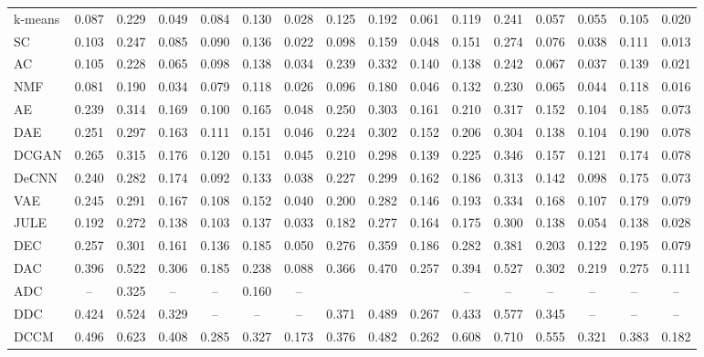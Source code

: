 \begin{table*}[t]
{\begin{tabular}{@{}lccccccccccccccc@{}}
k-means    & 0.087 & 0.229 & 0.049 & 0.084 & 0.130 & 0.028 & 0.125 & 0.192 & 0.061 & 0.119 & 0.241 & 0.057 & 0.055 & 0.105 & 0.020  \\
SC         & 0.103 & 0.247 & 0.085 & 0.090 & 0.136 & 0.022 & 0.098 & 0.159 & 0.048 & 0.151 & 0.274 & 0.076 & 0.038 & 0.111 & 0.013  \\
AC         & 0.105 & 0.228 & 0.065 & 0.098 & 0.138 & 0.034 & 0.239 & 0.332 & 0.140 & 0.138 & 0.242 & 0.067 & 0.037 & 0.139 & 0.021  \\
NMF        & 0.081 & 0.190 & 0.034 & 0.079 & 0.118 & 0.026 & 0.096 & 0.180 & 0.046 & 0.132 & 0.230 & 0.065 & 0.044 & 0.118 & 0.016  \\
AE         & 0.239 & 0.314 & 0.169 & 0.100 & 0.165 & 0.048 & 0.250 & 0.303 & 0.161 & 0.210 & 0.317 & 0.152 & 0.104 & 0.185 & 0.073  \\
DAE        & 0.251 & 0.297 & 0.163 & 0.111 & 0.151 & 0.046 & 0.224 & 0.302 & 0.152 & 0.206 & 0.304 & 0.138 & 0.104 & 0.190 & 0.078  \\
DCGAN      & 0.265 & 0.315 & 0.176 & 0.120 & 0.151 & 0.045 & 0.210 & 0.298 & 0.139 & 0.225 & 0.346 & 0.157 & 0.121 & 0.174 & 0.078  \\
DeCNN      & 0.240 & 0.282 & 0.174 & 0.092 & 0.133 & 0.038 & 0.227 & 0.299 & 0.162 & 0.186 & 0.313 & 0.142 & 0.098 & 0.175 & 0.073  \\
VAE        & 0.245 & 0.291 & 0.167 & 0.108 & 0.152 & 0.040 & 0.200 & 0.282 & 0.146 & 0.193 & 0.334 & 0.168 & 0.107 & 0.179 & 0.079  \\
JULE       & 0.192 & 0.272 & 0.138 & 0.103 & 0.137 & 0.033 & 0.182 & 0.277 & 0.164 & 0.175 & 0.300 & 0.138 & 0.054 & 0.138 & 0.028  \\
DEC        & 0.257 & 0.301 & 0.161 & 0.136 & 0.185 & 0.050 & 0.276 & 0.359 & 0.186 & 0.282 & 0.381 & 0.203 & 0.122 & 0.195 & 0.079  \\
DAC        & 0.396 & 0.522 & 0.306 & 0.185 & 0.238 & 0.088 & 0.366 & 0.470 & 0.257 & 0.394 & 0.527 & 0.302 & 0.219 & 0.275 & 0.111  \\
ADC       & --     & 0.325 & --     & --     & 0.160 & --  &  &  &     & --     & --     & --     & --     & --     & --    \\
DDC        & 0.424 & 0.524 & 0.329 & --     & --     & --   & 0.371 & 0.489 & 0.267    & 0.433 & 0.577 & 0.345 & --     & --     & --     \\
DCCM       & 0.496 & 0.623 & 0.408 & 0.285 & 0.327 & 0.173 & 0.376 & 0.482 & 0.262 & 0.608 & 0.710 & 0.555 & 0.321 & 0.383 & 0.182  \\

\end{tabular}}
\end{table*}
